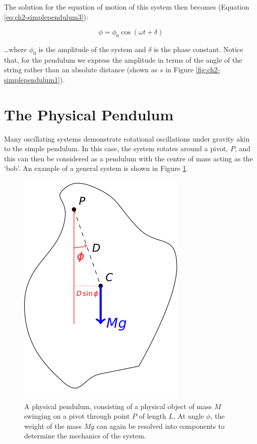 \documentclass[
]{book}
\begin{document}
The solution for the equation of motion of this system then becomes (Equation \eqref{eq:ch2-simplependulum3}):

\begin{equation}
\phi = \phi_0 \cos (\omega t + \delta)
\label{eq:ch2-simplependulum3}
\end{equation}

\ldots where \(\phi_0\) is the amplitude of the system and \(\delta\) is the phase constant. Notice that, for the pendulum we express the amplitude in terms of the angle of the string rather than an absolute distance (shown as \(s\) in Figure \ref{fig:ch2-simplependulum1}).

\hypertarget{sec-ch2-physicalpendulum}{%
\section{The Physical Pendulum}\label{sec-ch2-physicalpendulum}}

Many oscillating systems demonstrate rotational oscillations under gravity akin to the simple pendulum. In this case, the system rotates around a pivot, \(P\), and this can then be considered as a pendulum with the centre of mass acting as the `bob'. An example of a general system is shown in Figure \ref{fig:ch2-physicalpendulum1}.

\begin{figure}

{\centering \includegraphics[width=0.4\linewidth]{visualisations/LaTeX/ch2-physicalpendulum1} 

}

\caption{A physical pendulum, consisting of a physical object of mass $M$ swinging on a pivot through point $P$ of length $L$. At angle $\phi$, the weight of the mass $Mg$ can again be resolved into components to determine the mechanics of the system.}\label{fig:ch2-physicalpendulum1}
\end{figure}
\end{document}
